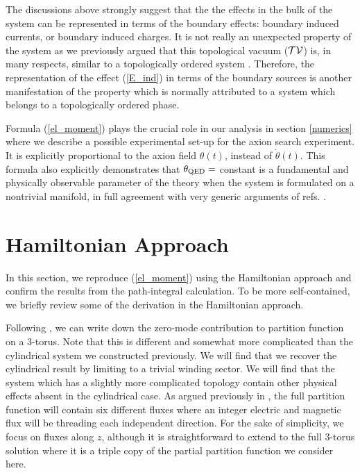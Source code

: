 \documentclass[ twocolumn,aps,prd,   
               preprintnumbers,numbers,sort&compress,nofootinbib,
                            showpacs,superscriptaddress,
               colorlinks,
               linkcolor=blue,   
               citecolor=blue]{revtex4-1}   \newcommand{\exclude}[1]{}
\begin{document}
 The discussions above strongly suggest that the the effects in the bulk of the system  can be represented in terms of the boundary effects: 
 boundary induced currents, or boundary induced charges. It is not really an unexpected property  of the system as we previously argued that this topological vacuum ($\cal{TV}$) is, in many respects, similar to a topologically ordered system \cite{Zhitnitsky:2013hba,Zhitnitsky:2014dra}. Therefore, the representation of the effect (\ref{E_ind}) in terms of the   boundary sources is another manifestation of the   property which is normally attributed to a system which belongs to  a   topologically ordered phase. 
 
 Formula (\ref{el_moment}) plays the crucial role in our analysis  in section \ref{numerics} where we describe a possible experimental set-up for the axion search experiment. It is explicitly proportional to the axion field $\theta(t)$, instead of $\dot{\theta}(t)$. This formula 
  also  explicitly  demonstrates  that  $\theta_{\rm QED}=$ constant  is a fundamental and physically observable parameter of the theory when  the system is formulated on a nontrivial manifold, in full agreement with very generic arguments of refs.
  \cite{Witten:1995gf,Verlinde:1995mz,Olive:2000yy}. 

 
 
 \section{Hamiltonian Approach}\label{Hamiltonian}

 In this section, we reproduce (\ref{el_moment}) using the Hamiltonian approach and confirm the results from the path-integral calculation.  To be more self-contained, we briefly review some of the derivation in the Hamiltonian approach.



Following \cite{Chen-Lee:2010}, we can write down the zero-mode contribution to partition function on a 3-torus. Note that this is different and somewhat more complicated than the cylindrical system we constructed previously. We will find that we recover the cylindrical result by limiting to a trivial winding sector. We will find that the system which has a slightly more complicated topology contain other physical effects absent in the cylindrical case. As argued previously in  \cite{Zhitnitsky:2014dra}, the full partition function will contain six different fluxes where an integer electric and magnetic flux will be threading each independent direction. For the sake of simplicity, we focus on fluxes along $z$, although it is straightforward to extend to the full 3-torus solution where it is a triple copy of the partial partition function we consider here. 
\end{document}
